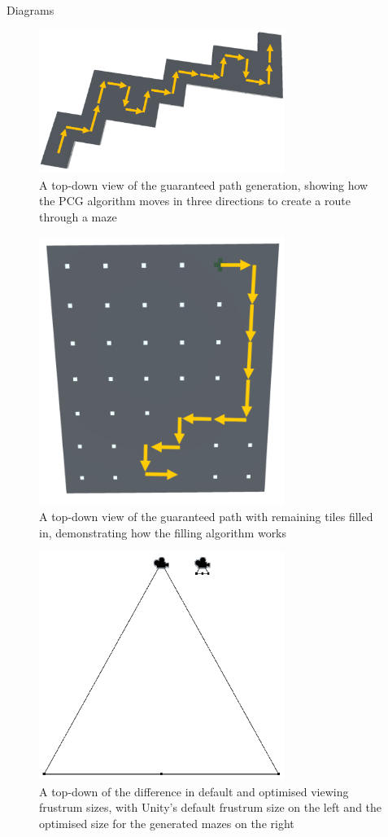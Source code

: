 \documentclass[progress]{cmpreport}
\begin{document}
\begin{section}{Diagrams}

\begin{figure}[H]
    \centering
    \includegraphics[width=8cm]{img/1-maze.png}
    \caption{A top-down view of the guaranteed path generation, showing how the PCG algorithm moves in three directions to create a route through a maze}
    \label{fig:pathgen}
\end{figure}

\begin{figure}[H]
    \centering
    \includegraphics[width=8cm]{img/filled-path.png}
    \caption{A top-down view of the guaranteed path with remaining tiles filled in, demonstrating how the filling algorithm works}
    \label{fig:filledpath}
\end{figure}

\begin{figure}[H]
    \centering
    \includegraphics[width=8cm]{img/frustrums.png}
    \caption{A top-down of the difference in default and optimised viewing frustrum sizes, with Unity's default frustrum size on the left and the optimised size for the generated mazes on the right}
    \label{fig:frustrums}
\end{figure}


\end{section}
\end{document}
